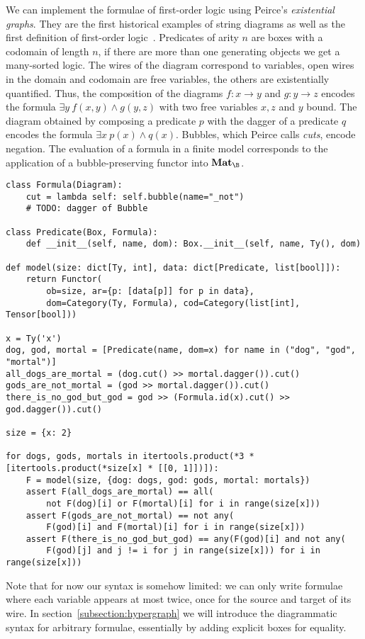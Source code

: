 \begin{example}\label{example:monoidal-formula}
We can implement the formulae of first-order logic using Peirce's \emph{existential graphs}.
They are the first historical examples of string diagrams as well as the first definition of first-order logic~\cite{BradyTrimble98,BradyTrimble00,MelliesZeilberger16,HaydonSobocinski20}.
Predicates of arity $n$ are boxes with a codomain of length $n$, if there are more than one generating objects we get a many-sorted logic.
The wires of the diagram correspond to variables, open wires in the domain and codomain are free variables, the others are existentially quantified.
Thus, the composition of the diagrams $f : x \to y$ and $g : y \to z$ encodes the formula $\exists y \ f(x, y) \land g(y, z)$ with two free variables $x, z$ and $y$ bound.
The diagram obtained by composing a predicate $p$ with the dagger of a predicate $q$ encodes the formula $\exists x \ p(x) \land q(x)$.
Bubbles, which Peirce calls \emph{cuts}, encode negation.
The evaluation of a formula in a finite model corresponds to the application of a bubble-preserving functor into $\mathbf{Mat}_\B$.

\begin{verbatim}
class Formula(Diagram):
    cut = lambda self: self.bubble(name="_not")
    # TODO: dagger of Bubble

class Predicate(Box, Formula):
    def __init__(self, name, dom): Box.__init__(self, name, Ty(), dom)

def model(size: dict[Ty, int], data: dict[Predicate, list[bool]]):
    return Functor(
        ob=size, ar={p: [data[p]] for p in data},
        dom=Category(Ty, Formula), cod=Category(list[int], Tensor[bool]))

x = Ty('x')
dog, god, mortal = [Predicate(name, dom=x) for name in ("dog", "god", "mortal")]
all_dogs_are_mortal = (dog.cut() >> mortal.dagger()).cut()
gods_are_not_mortal = (god >> mortal.dagger()).cut()
there_is_no_god_but_god = god >> (Formula.id(x).cut() >> god.dagger()).cut()

size = {x: 2}

for dogs, gods, mortals in itertools.product(*3 * [itertools.product(*size[x] * [[0, 1]])]):
    F = model(size, {dog: dogs, god: gods, mortal: mortals})
    assert F(all_dogs_are_mortal) == all(
        not F(dog)[i] or F(mortal)[i] for i in range(size[x]))
    assert F(gods_are_not_mortal) == not any(
        F(god)[i] and F(mortal)[i] for i in range(size[x]))
    assert F(there_is_no_god_but_god) == any(F(god)[i] and not any(
        F(god)[j] and j != i for j in range(size[x])) for i in range(size[x]))
\end{verbatim}

Note that for now our syntax is somehow limited: we can only write formulae where each variable appears at most twice, once for the source and target of its wire.
In section~\ref{subsection:hypergraph} we will introduce the diagrammatic syntax for arbitrary formulae, essentially by adding explicit boxes for equality.
\end{example}

